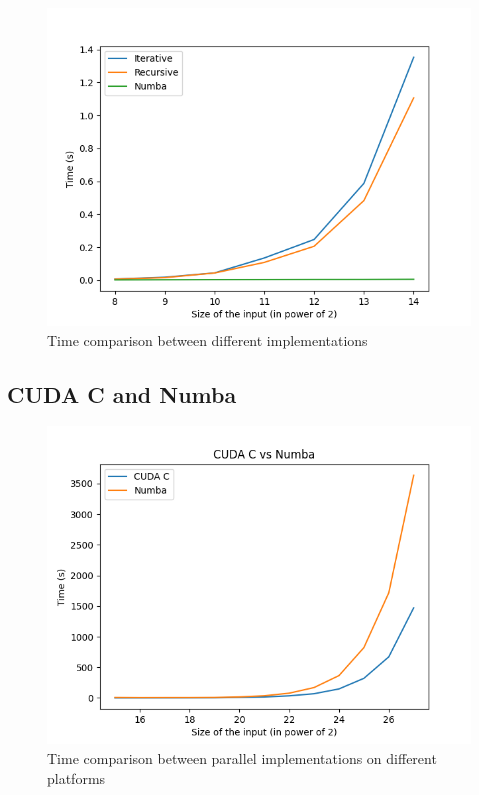 \documentclass[a4paper, 12pt, oneside]{article}
\begin{document}
\begin{figure}[!h]
  \includegraphics[width=400pt]{images/cpu_vs_gpu.png}
  \caption{Time comparison between different implementations}
\end{figure}

\subsection{CUDA C and Numba}

\begin{figure}[!h]
  \includegraphics[width=400pt]{images/cpp_vs_py.png}
  \caption{Time comparison between parallel implementations on different platforms}
\end{figure}
\end{document}
